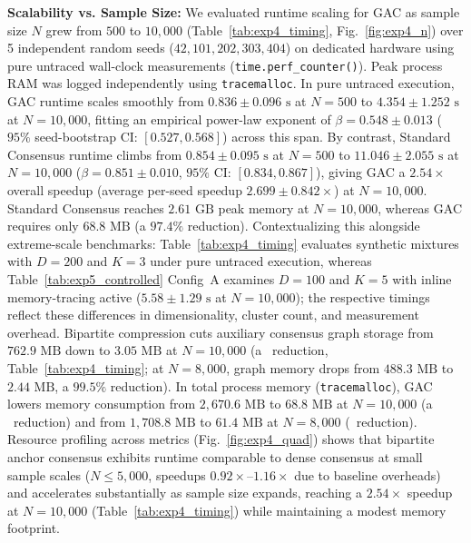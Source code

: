 \documentclass[pdflatex,sn-mathphys-num]{sn-jnl}
\theoremstyle{thmstyleone}
\theoremstyle{thmstyletwo}
\theoremstyle{thmstylethree}
\begin{document}
\textbf{Scalability vs. Sample Size:}
We evaluated runtime scaling for GAC as sample size $N$ grew from $500$ to $10{,}000$ (Table~\ref{tab:exp4_timing}, Fig.~\ref{fig:exp4_n}) over 5 independent random seeds ($42, 101, 202, 303, 404$) on dedicated hardware using pure untraced wall-clock measurements (\texttt{time.perf\_counter()}). Peak process RAM was logged independently using \texttt{tracemalloc}. In pure untraced execution, GAC runtime scales smoothly from $0.836 \pm 0.096\text{ s}$ at $N=500$ to $4.354 \pm 1.252\text{ s}$ at $N=10{,}000$, fitting an empirical power-law exponent of $\beta = 0.548 \pm 0.013$ ($95\%$ seed-bootstrap CI: $[0.527, 0.568]$) across this span. By contrast, Standard Consensus runtime climbs from $0.854 \pm 0.095\text{ s}$ at $N=500$ to $11.046 \pm 2.055\text{ s}$ at $N=10{,}000$ ($\beta = 0.851 \pm 0.010$, $95\%$ CI: $[0.834, 0.867]$), giving GAC a $2.54\times$ overall speedup (average per-seed speedup $2.699 \pm 0.842\times$) at $N=10{,}000$. Standard Consensus reaches $2.61\text{ GB}$ peak memory at $N=10{,}000$, whereas GAC requires only $68.8\text{ MB}$ (a $97.4\%$ reduction). Contextualizing this alongside extreme-scale benchmarks: Table~\ref{tab:exp4_timing} evaluates synthetic mixtures with $D=200$ and $K=3$ under pure untraced execution, whereas Table~\ref{tab:exp5_controlled} Config~A examines $D=100$ and $K=5$ with inline memory-tracing active ($5.58 \pm 1.29\text{ s}$ at $N=10{,}000$); the respective timings reflect these differences in dimensionality, cluster count, and measurement overhead. Bipartite compression cuts auxiliary consensus graph storage from $762.9\text{ MB}$ down to $3.05\text{ MB}$ at $N=10{,}000$ (a \MemoryScalingTenKGraphReduction\ reduction, Table~\ref{tab:exp4_timing}; at $N=8{,}000$, graph memory drops from $488.3\text{ MB}$ to $2.44\text{ MB}$, a $99.5\%$ reduction). In total process memory (\texttt{tracemalloc}), GAC lowers memory consumption from $2{,}670.6\text{ MB}$ to $68.8\text{ MB}$ at $N=10{,}000$ (a \MemoryScalingTenKReduction\ reduction) and from $1{,}708.8\text{ MB}$ to $61.4\text{ MB}$ at $N=8{,}000$ (\MemoryScalingEightKReduction\ reduction). Resource profiling across metrics (Fig.~\ref{fig:exp4_quad}) shows that bipartite anchor consensus exhibits runtime comparable to dense consensus at small sample scales ($N \le 5{,}000$, speedups $0.92\times\text{--}1.16\times$ due to baseline overheads) and accelerates substantially as sample size expands, reaching a $2.54\times$ speedup at $N = 10{,}000$ (Table~\ref{tab:exp4_timing}) while maintaining a modest memory footprint.
\end{document}
